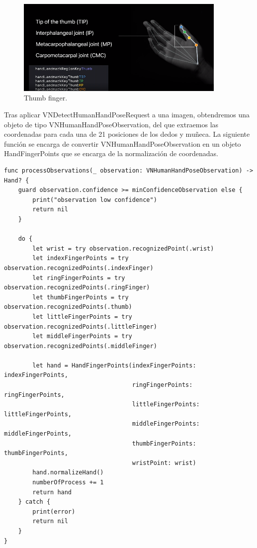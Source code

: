\documentclass[../main.tex]{subfiles}
\begin{document}
\begin{figure}[h]
\centering 
\includegraphics[width=0.9\textwidth]{images/trainingapp/handpose/handpose4.png}
\caption{Thumb finger.}
\label{figure13}
\end{figure}
    
Tras aplicar VNDetectHumanHandPoseRequest a una imagen, obtendremos una objeto de tipo VNHumanHandPoseObservation, del que extraemos las coordenadas para cada una de 21 posiciones de los dedos y muñeca. La siguiente función se encarga de convertir VNHumanHandPoseObservation en un objeto HandFingerPoints que se encarga de la normalización de coordenadas.

\begin{lstlisting}[style=swift]
func processObservations(_ observation: VNHumanHandPoseObservation) -> Hand? {
    guard observation.confidence >= minConfidenceObservation else {
        print("observation low confidence")
        return nil
    }
    
    do {
        let wrist = try observation.recognizedPoint(.wrist)
        let indexFingerPoints = try observation.recognizedPoints(.indexFinger)
        let ringFingerPoints = try observation.recognizedPoints(.ringFinger)
        let thumbFingerPoints = try observation.recognizedPoints(.thumb)
        let littleFingerPoints = try observation.recognizedPoints(.littleFinger)
        let middleFingerPoints = try observation.recognizedPoints(.middleFinger)
        
        let hand = HandFingerPoints(indexFingerPoints: indexFingerPoints,
                                    ringFingerPoints: ringFingerPoints,
                                    littleFingerPoints: littleFingerPoints,
                                    middleFingerPoints: middleFingerPoints,
                                    thumbFingerPoints: thumbFingerPoints,
                                    wristPoint: wrist)
        hand.normalizeHand()
        numberOfProcess += 1
        return hand
    } catch {
        print(error)
        return nil
    }
}
\end{lstlisting}
\end{document}
